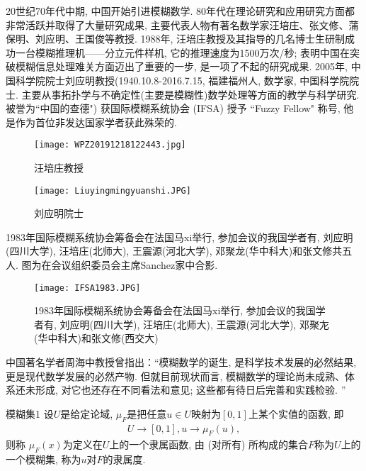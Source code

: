20世纪70年代中期, 中国开始引进模糊数学.
80年代在理论研究和应用研究方面都非常活跃并取得了大量研究成果, 主要代表人物有著名数学家汪培庄、张文修、蒲保明、刘应明、王国俊等教授.
1988年, 汪培庄教授及其指导的几名博士生研制成功一台模糊推理机——分立元件样机, 它的推理速度为1500万次/秒; 表明中国在突破模糊信息处理难关方面迈出了重要的一步, 是一项了不起的研究成果.
2005年, 中国科学院院士刘应明教授(1940.10.8-2016.7.15, 福建福州人, 数学家, 中国科学院院士.
主要从事拓扑学与不确定性(主要是模糊性)数学处理等方面的教学与科学研究. 被誉为“中国的查德") 获国际模糊系统协会 (IFSA) 授予 ``Fuzzy Fellow" 称号, 他是作为首位非发达国家学者获此殊荣的.
    \vspace{-0.4cm}
\begin{figure}[H]
    \centering
    \texttt{[image: WPZ20191218122443.jpg]}
    \caption{汪培庄教授}
    \label{WPZ20191218122443}
    \vspace{-0.4cm}
\end{figure}
\vspace{-0.8cm}
\begin{figure}[H]
    \centering
    \texttt{[image: Liuyingmingyuanshi.JPG]}
    \caption{刘应明院士}
    \label{WPZ20191218122443}
    \vspace{-0.4cm}
\end{figure}
1983年国际模糊系统协会筹备会在法国马xi举行, 参加会议的我国学者有, 刘应明(四川大学), 汪培庄(北师大), 王震源(河北大学), 邓聚龙(华中科大)和张文修共五人. 图为在会议组织委员会主席Sanchez家中合影.
\begin{figure}[H]
    \centering
    \texttt{[image: IFSA1983.JPG]}
    \caption{1983年国际模糊系统协会筹备会在法国马xi举行, 参加会议的我国学者有, 刘应明(四川大学), 汪培庄(北师大), 王震源(河北大学), 邓聚㔫(华中科大)和张文修(西交大)}
    \label{WPZ20191218122443}
\end{figure}


\begin{remark}
    中国著名学者周海中教授曾指出：“模糊数学的诞生, 是科学技术发展的必然结果, 更是现代数学发展的必然产物. 但就目前现状而言, 模糊数学的理论尚未成熟、体系还未形成, 对它也还存在不同看法和意见; 这些都有待日后完善和实践检验. ”
\end{remark}
\begin{mydef}{模糊集}{1}
设$U$是给定论域, $\mu_F$是把任意$u\in U$映射为$[0, 1]$上某个实值的函数, 即
\begin{align}
    U\rightarrow [0, 1], u\rightarrow \mu_F(u),
\end{align}
则称 $\mu_F(x)$为定义在$U$上的一个隶属函数, 由   (对所有) 所构成的集合$F$称为$U$上的一个模糊集, 称为$u$对$F$的隶属度.
\end{mydef}

